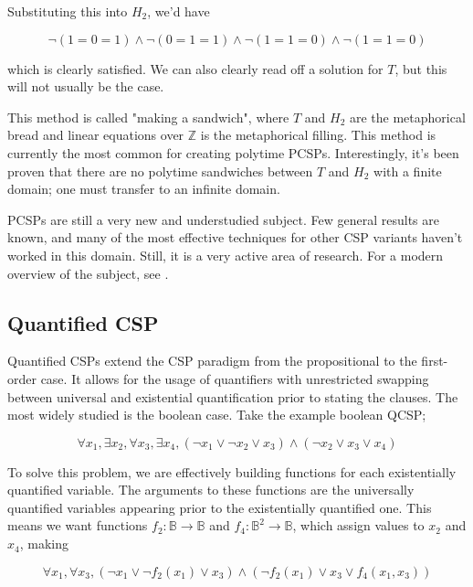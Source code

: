 Substituting this into $H_2$, we'd have

\begin{equation}
    \neg (1 = 0 = 1) \wedge \neg (0 = 1 = 1) \wedge \neg (1 = 1 = 0) \wedge \neg (1 = 1 = 0)
\end{equation}

which is clearly satisfied. We can also clearly read off a solution for $T$, but this will not usually be the case.

This method is called "making a sandwich", where $T$ and $H_2$ are the metaphorical bread and linear equations over $\mathbb{Z}$ is the metaphorical filling. This method is currently the most common for creating polytime PCSPs. Interestingly, it's been proven that there are no polytime sandwiches between $T$ and $H_2$ with a finite domain; one must transfer to an infinite domain.

PCSPs are still a very new and understudied subject. Few general results are known, and many of the most effective techniques for other CSP variants haven't worked in this domain. Still, it is a very active area of research. For a modern overview of the subject, see \citep{krokhin2022invitation}.

\subsection{Quantified CSP}\label{sec:quantified}

Quantified CSPs extend the CSP paradigm from the propositional to the first-order case. It allows for the usage of quantifiers with unrestricted swapping between universal and existential quantification prior to stating the clauses. The most widely studied is the boolean case. Take the example boolean QCSP;

\begin{equation}
    \forall x_1, \exists x_2, \forall x_3, \exists x_4, (\neg x_1 \vee \neg x_2 \vee x_3) \wedge (\neg x_2 \vee x_3 \vee x_4)
\end{equation}

To solve this problem, we are effectively building functions for each existentially quantified variable. The arguments to these functions are the universally quantified variables appearing prior to the existentially quantified one. This means we want functions $f_2 : \mathbb{B} \rightarrow \mathbb{B}$ and $f_4 : \mathbb{B}^2 \rightarrow \mathbb{B}$, which assign values to $x_2$ and $x_4$, making

\begin{equation}
    \forall x_1, \forall x_3, (\neg x_1 \vee \neg f_2(x_1) \vee x_3) \wedge (\neg f_2(x_1) \vee x_3 \vee f_4(x_1, x_3))
\end{equation}

